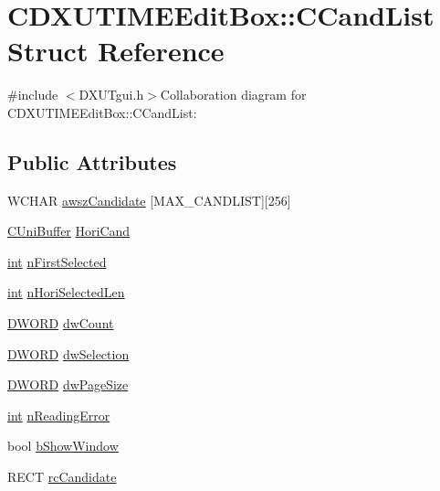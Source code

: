 \hypertarget{struct_c_d_x_u_t_i_m_e_edit_box_1_1_c_cand_list}{
\section{CDXUTIMEEditBox::CCandList Struct Reference}
\label{struct_c_d_x_u_t_i_m_e_edit_box_1_1_c_cand_list}
}


{\ttfamily \#include $<$DXUTgui.h$>$}Collaboration diagram for CDXUTIMEEditBox::CCandList:\subsection*{Public Attributes}
\begin{DoxyCompactItemize}
\item 
WCHAR \hyperlink{struct_c_d_x_u_t_i_m_e_edit_box_1_1_c_cand_list_aef82c852a847a33235232f27e012cbf1}{awszCandidate} \mbox{[}MAX\_\-CANDLIST\mbox{]}\mbox{[}256\mbox{]}
\item 
\hyperlink{class_c_uni_buffer}{CUniBuffer} \hyperlink{struct_c_d_x_u_t_i_m_e_edit_box_1_1_c_cand_list_a7f1f8a0bfae767482eff260ad18702a7}{HoriCand}
\item 
\hyperlink{_d_x_u_tgui_8cpp_a2d77ed03302b6978834ee3b6f57837fb}{int} \hyperlink{struct_c_d_x_u_t_i_m_e_edit_box_1_1_c_cand_list_ae823d620ceb0fb648c83435135b01641}{nFirstSelected}
\item 
\hyperlink{_d_x_u_tgui_8cpp_a2d77ed03302b6978834ee3b6f57837fb}{int} \hyperlink{struct_c_d_x_u_t_i_m_e_edit_box_1_1_c_cand_list_a64a1f4e408499157b031083bdd487aff}{nHoriSelectedLen}
\item 
\hyperlink{class_c_d_x_u_t_i_m_e_edit_box_a4666fce9b285d692ceb0515bf2dbde90}{DWORD} \hyperlink{struct_c_d_x_u_t_i_m_e_edit_box_1_1_c_cand_list_a74bcc9376411c8c858ff1f7b04fff215}{dwCount}
\item 
\hyperlink{class_c_d_x_u_t_i_m_e_edit_box_a4666fce9b285d692ceb0515bf2dbde90}{DWORD} \hyperlink{struct_c_d_x_u_t_i_m_e_edit_box_1_1_c_cand_list_a00ec4a3e33ec3d8a4b8a0d878aac99b2}{dwSelection}
\item 
\hyperlink{class_c_d_x_u_t_i_m_e_edit_box_a4666fce9b285d692ceb0515bf2dbde90}{DWORD} \hyperlink{struct_c_d_x_u_t_i_m_e_edit_box_1_1_c_cand_list_aac258950f85f59272514ca97f2873a2c}{dwPageSize}
\item 
\hyperlink{_d_x_u_tgui_8cpp_a2d77ed03302b6978834ee3b6f57837fb}{int} \hyperlink{struct_c_d_x_u_t_i_m_e_edit_box_1_1_c_cand_list_a3e9e90ede32fae394f178ec6d353ce96}{nReadingError}
\item 
bool \hyperlink{struct_c_d_x_u_t_i_m_e_edit_box_1_1_c_cand_list_a6bc94b56fbc55dd65256ab6b310d8b7e}{bShowWindow}
\item 
RECT \hyperlink{struct_c_d_x_u_t_i_m_e_edit_box_1_1_c_cand_list_a1156d0c172cab967842783b7a33f7d63}{rcCandidate}
\end{DoxyCompactItemize}


